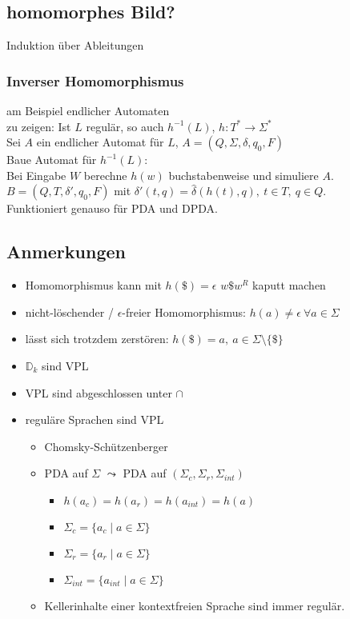     \subsection{homomorphes Bild?}
    Induktion über Ableitungen\\
    \subsubsection{Inverser Homomorphismus}
    am Beispiel endlicher Automaten\\
    zu zeigen: Ist $L$ regulär, so auch $h^{-1}(L)$, $h: T^*\rightarrow \Sigma^*$\\
    Sei $A$ ein endlicher Automat für $L$, $A=(Q,\Sigma,\delta,q_0,F)$\\
    Baue Automat für $h^{-1}(L)$:\\
    Bei Eingabe $W$ berechne $h(w)$ buchstabenweise und simuliere $A$. $B=(Q,T,\delta',q_0,F)$ mit $\delta'(t,q)=\hat{\delta}(h(t),q),\ t\in T,\ q\in Q$.\\
    Funktioniert genauso für PDA und DPDA.
    \subsection{Anmerkungen}
    \begin{itemize}
        \item Homomorphismus kann mit $h(\$)=\epsilon$ $w\$ w^R$ kaputt machen
        \item nicht-löschender / $\epsilon$-freier Homomorphismus: $h(a)\not= \epsilon\ \forall a\in\Sigma$
        \item lässt sich trotzdem zerstören: $h(\$)=a,\ a\in\Sigma\setminus\{\$\}$
        \item $\mathds{D}_k$ sind VPL
        \item VPL sind abgeschlossen unter $\cap$
        \item reguläre Sprachen sind VPL
        \begin{itemize}
            \item Chomsky-Schützenberger
            \item PDA auf $\Sigma$ $\leadsto$ PDA auf $(\Sigma_c,\Sigma_r,\Sigma_{int})$
            \begin{itemize}
                \item $h(a_c)=h(a_r)=h(a_{int})=h(a)$
                \item $\Sigma_c=\{a_c\mid a\in\Sigma\}$
                \item $\Sigma_r=\{a_r\mid a\in\Sigma\}$
                \item $\Sigma_{int}=\{a_{int}\mid a\in\Sigma\}$
            \end{itemize}
            \item Kellerinhalte einer kontextfreien Sprache sind immer regulär.
        \end{itemize}
    \end{itemize}
